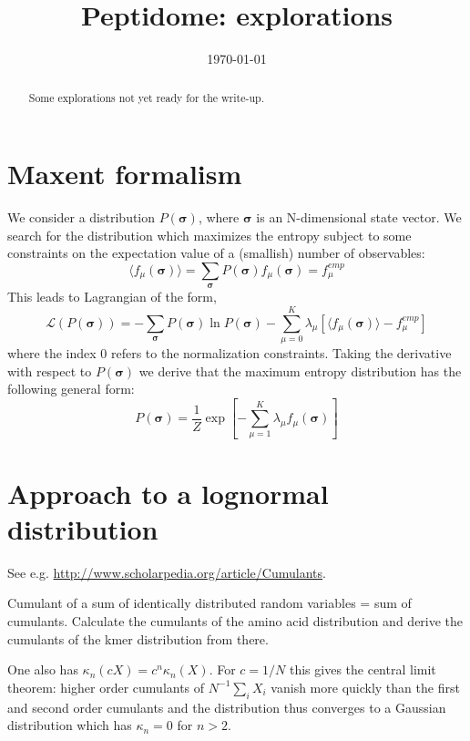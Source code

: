 \documentclass[superscriptaddress,onecolumn,pre]{revtex4}
\newcommand{\B}{\boldsymbol}
\newcommand{\<}{\langle}
\renewcommand{\>}{\rangle}
\def\[[{\left[}
\def\]]{\right]}
\begin{document}
\title{Peptidome: explorations}
\date{\today}

\begin{abstract}
    Some explorations not yet ready for the write-up.
\end{abstract}

\maketitle

\section{Maxent formalism}
We consider a distribution $P(\boldsymbol \sigma)$, where $\boldsymbol \sigma$ is an N-dimensional state vector. We search for the distribution which maximizes the entropy subject to some constraints on the expectation value of a (smallish) number of observables:
\begin{equation}
\langle f_\mu(\boldsymbol \sigma)\rangle = \sum_{\boldsymbol \sigma} P(\boldsymbol \sigma) f_\mu(\boldsymbol \sigma) = f_\mu^{emp}
\end{equation}
This leads to Lagrangian of the form,
\begin{equation}
    \mathcal{L}(P(\B \sigma)) = - \sum_{\B \sigma} P(\B \sigma) \ln P(\B \sigma) - \sum_{\mu = 0}^K \lambda_\mu \[[ \langle f_\mu(\boldsymbol \sigma) \rangle - f_\mu^{emp} \]]
\end{equation}
where the index 0 refers to the normalization constraints. Taking the derivative with respect to $P(\B \sigma)$ we derive that the maximum entropy distribution has the following general form:
\begin{equation}
    P(\boldsymbol \sigma) = \frac{1}{Z} \exp\left[ -\sum_{\mu=1}^K \lambda_\mu f_\mu(\boldsymbol \sigma) \right]
\end{equation}


\section{Approach to a lognormal distribution}

See e.g. \url{http://www.scholarpedia.org/article/Cumulants}.

Cumulant of a sum of identically distributed random variables = sum of cumulants. Calculate the cumulants of the amino acid distribution and derive the cumulants of the kmer distribution from there.

One also has $\kappa_n(c X) = c^n \kappa_n(X)$. For $c = 1/N$ this gives the central limit theorem: higher order cumulants of $N^{-1} \sum_i X_i$ vanish more quickly than the first and second order cumulants and the distribution thus converges to a Gaussian distribution which has $\kappa_n = 0$ for $n>2$.
\end{document}
